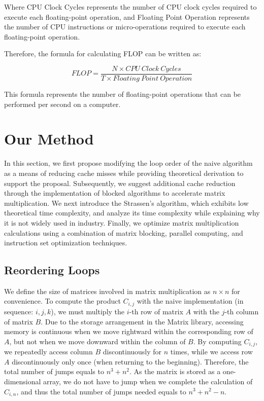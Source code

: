 \documentclass[conference]{IEEEtran}
\begin{document}
	
	Where CPU Clock Cycles represents the number of CPU clock cycles required to execute each floating-point operation, and Floating Point Operation represents the number of CPU instructions or micro-operations required to execute each floating-point operation.
	
	Therefore, the formula for calculating FLOP can be written as:
	
	\begin{equation}
		FLOP = \frac{N \times CPU \ Clock \ Cycles}{T \times Floating \ Point \ Operation}
	\end{equation}
	
	
	This formula represents the number of floating-point operations that can be performed per second on a computer.
	
	\section{Our Method}
	In this section, we first propose modifying the loop order of the naive algorithm as a means of reducing cache misses while providing theoretical derivation to support the proposal. Subsequently, we suggest additional cache reduction through the implementation of blocked algorithms to accelerate matrix multiplication. We next introduce the Strassen's algorithm, which exhibits low theoretical time complexity, and analyze its time complexity while explaining why it is not widely used in industry. Finally, we optimize matrix multiplication calculations using a combination of matrix blocking, parallel computing, and instruction set optimization techniques.
	
	\subsection{Reordering Loops}
	We define the size of matrices involved in matrix multiplication as $n \times n$ for convenience. To compute the product $C_{i,j}$ with the naive implementation (in sequence: $i, j, k$), we must multiply the $i$-th row of matrix $A$ with the $j$-th column of matrix $B$. Due to the storage arrangement in the Matrix library, accessing memory is continuous when we move rightward within the corresponding row of $A$, but not when we move downward within the column of $B$. By computing $C_{i,j}$, we repeatedly access column $B$ discontinuously for $n$ times, while we access row $A$ discontinuously only once (when returning to the beginning). Therefore, the total number of jumps equals to $n^3 + n^2$. As the matrix is stored as a one-dimensional array, we do not have to jump when we complete the calculation of $C_{i,n}$, and thus the total number of jumps needed equals to $n^3 + n^2 - n$.
	
\end{document}
